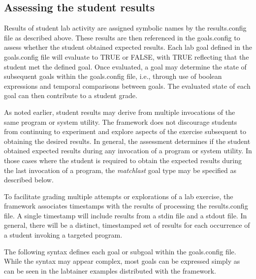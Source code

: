 \documentclass[12pt]{article}
\begin{document}
\subsection{Assessing the student results}
Results of student lab activity are assigned symbolic names by the results.config file
as described above.  These results are then referenced in the goals.config to assess whether
the student obtained expected results.  Each lab goal defined in the goals.config file
will evaluate to TRUE or FALSE, with TRUE reflecting that the student met the defined goal.
Once evaluated, a goal may determine the state of subsequent goals within the goals.config file, 
i.e., through use of boolean expressions and temporal comparisons between goals.  The evaluated
state of each goal can then contribute to a student grade.

As noted earlier, student results may derive from multiple invocations of the same program or system utility.  
The framework does not discourage students from continuing to experiment and explore aspects of the 
exercise subsequent to obtaining the desired results.  In general, the assessment determines if the student
obtained expected results during any invocation of a program or system utility.  In those cases 
where the student is required to obtain the expected results during the last invocation of a program, 
the \textit{matchlast} goal type may be specified as described below.

To facilitate grading multiple attempts or explorations of a lab exercise, the framework associates
timestamps with the results of processing the results.config file.  A single timestamp will
include results from a stdin file and a stdout file.  In general, there will be a distinct, 
timestamped set of results for each occurrence of a student invoking a targeted program.

The following syntax defines each goal or subgoal within the goals.config file.  While the syntax
may appear complex, most goals can be expressed simply as can be seen in the labtainer examples distributed
with the framework.
\end{document}
